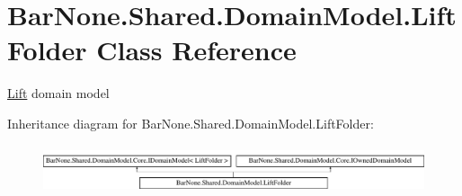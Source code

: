 \hypertarget{class_bar_none_1_1_shared_1_1_domain_model_1_1_lift_folder}{}\section{Bar\+None.\+Shared.\+Domain\+Model.\+Lift\+Folder Class Reference}
\label{class_bar_none_1_1_shared_1_1_domain_model_1_1_lift_folder}


\mbox{\hyperlink{class_bar_none_1_1_shared_1_1_domain_model_1_1_lift}{Lift}} domain model  


Inheritance diagram for Bar\+None.\+Shared.\+Domain\+Model.\+Lift\+Folder\+:\begin{figure}[H]
\begin{center}
\leavevmode
\includegraphics[height=1.435897cm]{class_bar_none_1_1_shared_1_1_domain_model_1_1_lift_folder}
\end{center}
\end{figure}
